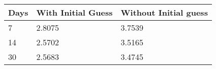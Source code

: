 \begin{tabular}{lll}
Days & With Initial Guess & Without Initial guess \\ 
\hline 
7 & 2.8075 & 3.7539 \\ 
14 & 2.5702 & 3.5165 \\ 
30 & 2.5683 & 3.4745 \\ 
\hline 
\end{tabular}